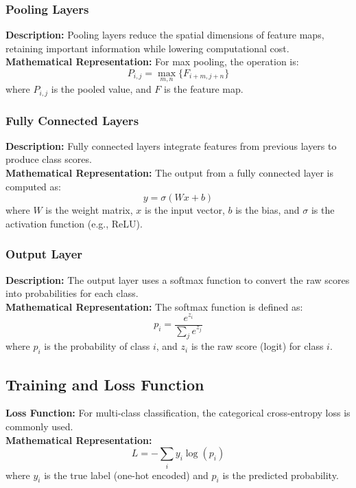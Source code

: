 \documentclass{article}
\begin{document}
\subsubsection{Pooling Layers}
\textbf{Description:} Pooling layers reduce the spatial dimensions of feature maps, retaining important information while lowering computational cost. \\
\textbf{Mathematical Representation:}
For max pooling, the operation is:
\begin{equation}
    P_{i,j} = \max_{m,n} \{ F_{i+m,j+n} \}
\end{equation}
where \( P_{i,j} \) is the pooled value, and \( F \) is the feature map.

\subsubsection{Fully Connected Layers}
\textbf{Description:} Fully connected layers integrate features from previous layers to produce class scores. \\
\textbf{Mathematical Representation:}
The output from a fully connected layer is computed as:
\begin{equation}
    y = \sigma(Wx + b)
\end{equation}
where \( W \) is the weight matrix, \( x \) is the input vector, \( b \) is the bias, and \( \sigma \) is the activation function (e.g., ReLU).

\subsubsection{Output Layer}
\textbf{Description:} The output layer uses a softmax function to convert the raw scores into probabilities for each class. \\
\textbf{Mathematical Representation:}
The softmax function is defined as:
\begin{equation}
    p_i = \frac{e^{z_i}}{\sum_{j} e^{z_j}}
\end{equation}
where \( p_i \) is the probability of class \( i \), and \( z_i \) is the raw score (logit) for class \( i \).

\subsection{Training and Loss Function}
\textbf{Loss Function:} For multi-class classification, the categorical cross-entropy loss is commonly used. \\
\textbf{Mathematical Representation:}
\begin{equation}
    L = -\sum_{i} y_i \log(p_i)
\end{equation}
where \( y_i \) is the true label (one-hot encoded) and \( p_i \) is the predicted probability.
\end{document}
